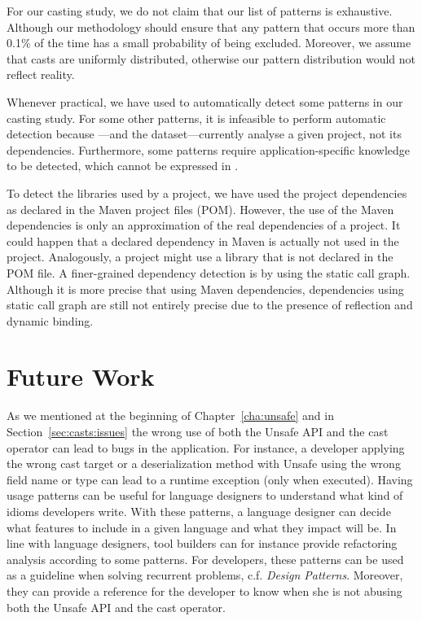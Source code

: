 For our casting study,
we do not claim that our list of patterns is exhaustive.
Although our methodology should ensure that any pattern that occurs more
than 0.1\% of the time has a small probability of being excluded.
Moreover, we assume that casts are uniformly distributed,
otherwise our pattern distribution would not reflect reality.

Whenever practical,
we have used \ql{} to automatically detect some patterns in our casting study.
For some other patterns, it is infeasible to perform automatic detection because \ql{}---and the \lgtm{} dataset---currently analyse a given project,
not its dependencies.
Furthermore, some patterns require application-specific knowledge to be detected,
which cannot be expressed in \ql{}.

To detect the libraries used by a project,
we have used the project dependencies as declared in the Maven project
files (POM).
However, the use of the Maven dependencies is only an approximation of
the real dependencies of a project.
It could happen that a declared dependency in Maven is actually not
used in the project.
Analogously, a project might use a library that is not declared in the POM file.
A finer-grained dependency detection is by using the static call graph.
Although it is more precise that using Maven dependencies,
dependencies using static call graph are still not entirely precise
due to the presence of reflection and dynamic binding.


\section{Future Work}

As we mentioned at the beginning of Chapter~\ref{cha:unsafe} and in Section~\ref{sec:casts:issues} the wrong use of both the Unsafe API and the cast operator can lead to bugs in the application.
For instance, a developer applying the wrong cast target or a deserialization method with Unsafe using the wrong field name or type
can lead to a runtime exception (only when executed).
Having usage patterns can be useful for language designers to understand what kind of idioms developers write.
With these patterns, a language designer can decide what features to include in a given language and what they impact will be.
In line with language designers, tool builders can for instance provide refactoring analysis according to some patterns.
For developers, these patterns can be used as a guideline when solving recurrent problems, c.f. \emph{Design Patterns}.
Moreover, they can provide a reference for the developer to know when she is not abusing both the Unsafe API and the cast operator.

